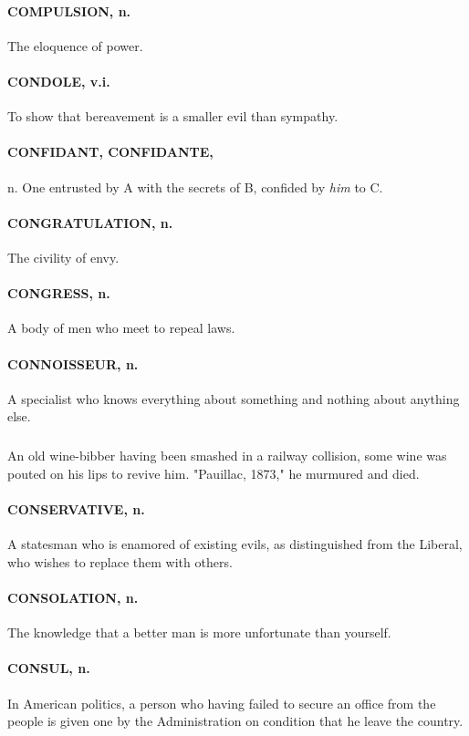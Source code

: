 \documentclass[11pt]{article}
\begin{document}
\paragraph{COMPULSION, n.}  The eloquence of power.

\paragraph{CONDOLE, v.i.}  To show that bereavement is a smaller evil than
sympathy.

\paragraph{CONFIDANT, CONFIDANTE,} n.  One entrusted by A with the secrets of B,
confided by {\em him} to C.

\paragraph{CONGRATULATION, n.}  The civility of envy.

\paragraph{CONGRESS, n.}  A body of men who meet to repeal laws.

\paragraph{CONNOISSEUR, n.}  A specialist who knows everything about something and
nothing about anything else.
\subparagraph{}   An old wine-bibber having been smashed in a railway collision,
some wine was pouted on his lips to revive him.  "Pauillac, 1873," he
murmured and died.

\paragraph{CONSERVATIVE, n.}  A statesman who is enamored of existing evils, as
distinguished from the Liberal, who wishes to replace them with
others.

\paragraph{CONSOLATION, n.}  The knowledge that a better man is more unfortunate
than yourself.

\paragraph{CONSUL, n.}  In American politics, a person who having failed to secure
an office from the people is given one by the Administration on
condition that he leave the country.
\end{document}
